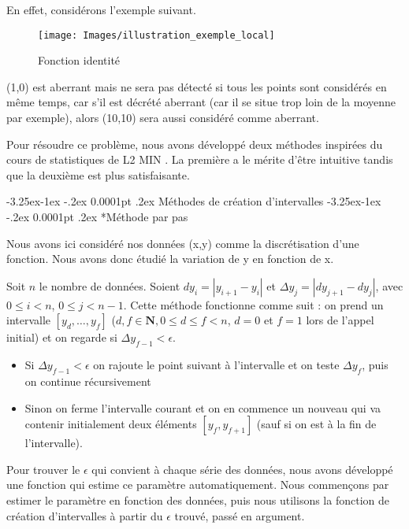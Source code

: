\documentclass[a4paper,12pt]{article} %
\makeatletter
\renewcommand\paragraph{\@startsection{paragraph}{4}{\z@}%
                                      {-3.25ex\@plus -1ex \@minus -.2ex}%
                                      {0.0001pt \@plus .2ex}%
                                      {\normalfont\normalsize\bfseries}}
\renewcommand\subparagraph{\@startsection{subparagraph}{5}{\z@}%
                                      {-3.25ex\@plus -1ex \@minus -.2ex}%
                                      {0.0001pt \@plus .2ex}%
                                      {\normalfont\normalsize\bfseries}}
\makeatother
\begin{document}
    			En effet, considérons l'exemple suivant.
    			\begin{figure}[H]
                \begin{center}
                \texttt{[image: Images/illustration\_exemple\_local]} 
                \end{center}
                \caption{Fonction identité}
                \label{NUL3}
                \end{figure}
                (1,0) est aberrant mais ne sera pas détecté si tous les points sont considérés en même temps, car s'il est décrété aberrant (car il se situe trop loin de la moyenne par exemple), alors (10,10) sera aussi considéré comme aberrant.
    				
			   Pour résoudre ce problème, nous avons développé deux méthodes inspirées du cours de statistiques de L2 MIN \cite{StatsL2MIN}. La première a le mérite d'être intuitive tandis que la deuxième est plus satisfaisante.
			   
			    \paragraph{\label{inter}Méthodes de création d'intervalles}
		            \subparagraph*{Méthode par pas}
			    
    			       Nous avons ici considéré nos données (x,y) comme la discrétisation d'une fonction. Nous avons donc étudié la variation de y en fonction de x.
    				    
    				    Soit $n$ le nombre de données.
                        Soient $dy_i=|y_{i+1}-y_i|$  et $\Delta y_j=|dy_{j+1}-dy_j|$,  avec  $0\le i < n$, $ 0 \le j< n-1$. Cette méthode fonctionne comme suit : on prend un intervalle $[y_d,…,y_f ]$ ($d,f \in \mathbf{N}, 0 \le d \le f < n$, $d = 0$ et $f = 1$ lors de l'appel initial) et on regarde si $\Delta y_{f-1}<\epsilon$.
                        \begin{itemize}
                        \item 	Si $\Delta y_{f-1}<\epsilon$ on rajoute le point suivant à l'intervalle et on teste $\Delta y_f$, puis on continue récursivement
                        \item 	Sinon on ferme l'intervalle courant et on en commence un nouveau qui va contenir initialement deux éléments $[y_f,y_{f+1}]$ (sauf si on est à la fin de l'intervalle).
                        \end{itemize}
                        Pour trouver le $\epsilon$ qui convient à chaque série des données, nous avons développé une fonction qui estime ce paramètre automatiquement. Nous commençons par estimer le paramètre en fonction des données, puis nous utilisons la fonction de création d'intervalles à partir du $\epsilon$ trouvé, passé en argument.
                        
\end{document}
